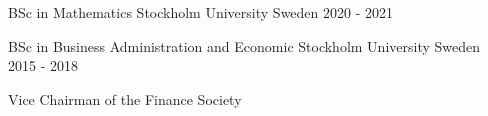 

\begin{cventries}

  \cventry
    {BSc in Mathematics} %
    {Stockholm University} %
    {Sweden} %
    {2020 - 2021} %
    { 
    }

  \cventry
    {BSc in Business Administration and Economic} %
    {Stockholm University} %
    {Sweden} %
    {2015 - 2018} %
    {
      \begin{cvitems} %
        \item {Vice Chairman of the Finance Society}
      \end{cvitems}
    }


\end{cventries}
